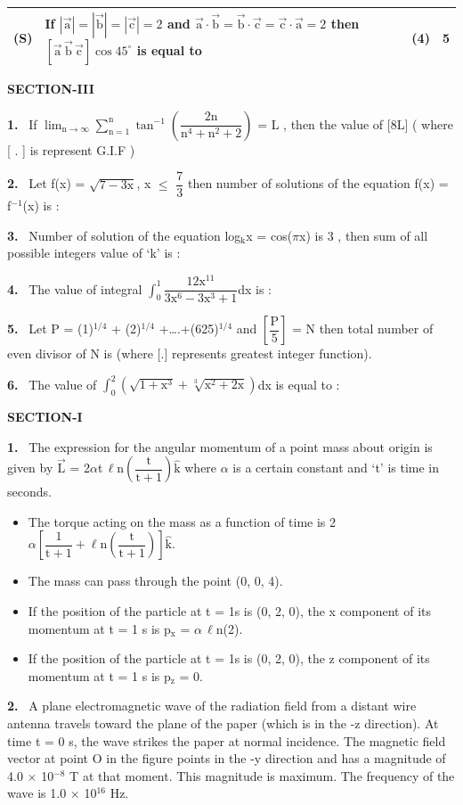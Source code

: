 \documentclass[10pt]{extarticle}
\newcommand{\papersec}[1]{\par\bigskip{\centering\Large\bfseries PAPER-#1\par}\medskip}
\newcommand{\partsec}[2]{\par\medskip\noindent{\large\bfseries PART-#1: #2}\par\smallskip}
\newcommand{\sect}[1]{\par\smallskip\noindent\textbf{#1}\par}
\newcommand{\qn}[1]{\par\smallskip\noindent\textbf{#1.}~}
\newenvironment{qoptions}{\begin{itemize}[leftmargin=1.8em,itemsep=1pt,topsep=2pt,label={}]}{\end{itemize}}
\newcommand{\opt}[2]{\item[(#1)] #2}
\begin{document}
\begin{multicols}{2}
{\begin{tabular}{|c|L{5.0cm}|c|L{0.8cm}|}
(S) & If $|\vec{\mathrm a}|=|\vec{\mathrm b}|=|\vec{\mathrm c}|=2$ and $\vec{\mathrm a}\cdot\vec{\mathrm b}=\vec{\mathrm b}\cdot\vec{\mathrm c}=\vec{\mathrm c}\cdot\vec{\mathrm a}=2$ then $[\vec{\mathrm a}\,\vec{\mathrm b}\,\vec{\mathrm c}]\cos45^\circ$ is equal to & (4) & 5 \\ \hline
\end{tabular}}\par
\sect{SECTION-III}
\qn{1} If $\displaystyle\lim_{\mathrm n\to\infty}\sum_{\mathrm n=1}^{\mathrm n}\tan^{-1}\left(\dfrac{2\mathrm n}{\mathrm n^4+\mathrm n^2+2}\right)$ = L , then the value of [8L] ( where [ . ] is represent G.I.F )
\qn{2} Let f(x) = $\sqrt{7-3\mathrm x}$, x $\leqslant$ $\dfrac73$ then number of solutions of the equation f(x) = f$^{-1}$(x) is :
\qn{3} Number of solution of the equation log$_\mathrm k$x = cos($\pi$x) is 3 , then sum of all possible integers value of `k' is :
\qn{4} The value of integral $\displaystyle\int_0^1\dfrac{12\mathrm x^{11}}{3\mathrm x^6-3\mathrm x^3+1}$dx is :
\qn{5} Let P = (1)$^{1/4}$ + (2)$^{1/4}$ +\ldots.+(625)$^{1/4}$ and $\left[\dfrac{\mathrm P}5\right]$ = N then total number of even divisor of N is (where [.] represents greatest integer function).
\qn{6} The value of $\displaystyle\int_0^2\left(\sqrt{1+\mathrm x^3}+\sqrt[3]{\mathrm x^2+2\mathrm x}\right)$dx is equal to :
\raggedcolumns
\papersec{2}
\partsec{1}{PHYSICS}
\sect{SECTION-I}
\qn{1} The expression for the angular momentum of a point mass about origin is given by $\vec{\mathrm L}$ = 2$\alpha$t$\,\ell$n$\left(\dfrac{\mathrm t}{\mathrm t+1}\right)\hat{\mathrm k}$ where $\alpha$ is a certain constant and `t' is time in seconds.
\begin{qoptions}
\opt{A}{The torque acting on the mass as a function of time is 2$\alpha\left[\dfrac1{\mathrm t+1}+\ell\mathrm n\left(\dfrac{\mathrm t}{\mathrm t+1}\right)\right]\hat{\mathrm k}$.}
\opt{B}{The mass can pass through the point (0, 0, 4).}
\opt{C}{If the position of the particle at t = 1s is (0, 2, 0), the x component of its momentum at t = 1 s is p$_\mathrm x$ = $\alpha\,\ell$n(2).}
\opt{D}{If the position of the particle at t = 1s is (0, 2, 0), the z component of its momentum at t = 1 s is p$_\mathrm z$ = 0.}
\end{qoptions}
\qn{2} A plane electromagnetic wave of the radiation field from a distant wire antenna travels toward the plane of the paper (which is in the -z direction). At time t = 0 s, the wave strikes the paper at normal incidence. The magnetic field vector at point O in the figure points in the -y direction and has a magnitude of 4.0 $\times$ 10$^{-8}$ T at that moment. This magnitude is maximum. The frequency of the wave is 1.0 $\times$ 10$^{16}$ Hz.\par

\end{multicols}
\end{document}
